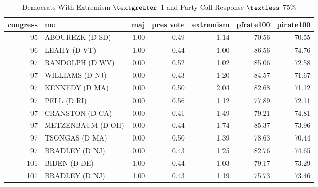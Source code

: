\documentclass[12pt]{article}
\begin{document}
\begin{table}[ht]
	\centering
		\caption{Democrats With Extremism $ \textgreater $ 1 and Party Call Response $ \textless $ 75\%}
	\begin{tabular}{rlrrrrr}
		\hline
		congress & mc & maj & pres vote & extremism & pfrate100 & pirate100 \\ 
		\hline
		95 & ABOUREZK (D SD) & 1.00 & 0.49 & 1.14 & 70.56 & 70.55 \\ 
		96 & LEAHY (D VT) & 1.00 & 0.44 & 1.00 & 86.56 & 74.76 \\ 
		97 & RANDOLPH (D WV) & 0.00 & 0.52 & 1.02 & 85.06 & 72.58 \\ 
		97 & WILLIAMS (D NJ) & 0.00 & 0.43 & 1.20 & 84.57 & 71.67 \\ 
		97 & KENNEDY (D MA) & 0.00 & 0.50 & 2.04 & 82.68 & 71.12 \\ 
		97 & PELL (D RI) & 0.00 & 0.56 & 1.12 & 77.89 & 72.11 \\ 
		97 & CRANSTON (D CA) & 0.00 & 0.41 & 1.49 & 79.21 & 74.81 \\ 
		97 & METZENBAUM (D OH) & 0.00 & 0.44 & 1.74 & 85.37 & 73.96 \\ 
		97 & TSONGAS (D MA) & 0.00 & 0.50 & 1.39 & 78.63 & 70.44 \\ 
		97 & BRADLEY (D NJ) & 0.00 & 0.43 & 1.25 & 82.76 & 74.65 \\ 
		101 & BIDEN (D DE) & 1.00 & 0.44 & 1.03 & 79.17 & 73.29 \\ 
		101 & BRADLEY (D NJ) & 1.00 & 0.43 & 1.19 & 75.73 & 73.46 \\ 
		\hline
	\end{tabular}
\end{table}
\end{document}
